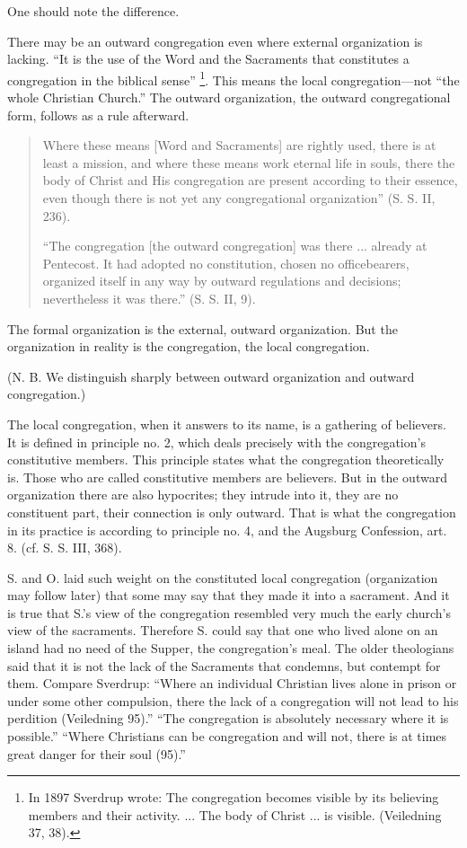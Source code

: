 One should note the difference.

There may be an outward congregation even where external organization is lacking. “It is the use of the Word and the Sacraments that constitutes a congregation in the biblical sense” \footnote{In 1897 Sverdrup wrote: The congregation becomes visible by its believing members and their activity. ... The body of Christ ... is visible. (Veiledning 37, 38).}. This means the local congregation—not “the whole Christian Church.” The outward organization, the outward congregational form, follows as a rule afterward.

\begin{quote}
Where these means [Word and Sacraments] are rightly used, there is at least a mission, and where these means work eternal life in souls, there the body of Christ and His congregation are present according to their essence, even though there is not yet any congregational organization” (S. S. II, 236).

“The congregation [the outward congregation] was there ... already at Pentecost. It had adopted no constitution, chosen no officebearers, organized itself in any way by outward regulations and decisions; nevertheless it was there.” (S. S. II, 9).

\end{quote}

The formal organization is the external, outward organization. But the organization in reality is the congregation, the local congregation.

(N. B. We distinguish sharply between outward organization and outward congregation.)

The local congregation, when it answers to its name, is a gathering of believers. It is defined in principle no. 2, which deals precisely with the congregation’s constitutive members. This principle states what the congregation theoretically is. Those who are called constitutive members are believers. But in the outward organization there are also hypocrites; they intrude into it, they are no constituent part, their connection is only outward. That is what the congregation in its practice is according to principle no. 4, and the Augsburg Confession, art. 8. (cf. S. S. III, 368).

S. and O. laid such weight on the constituted local congregation (organization may follow later) that some may say that they made it into a sacrament. And it is true that S.’s view of the congregation resembled very much the early church’s view of the sacraments. Therefore S. could say that one who lived alone on an island had no need of the Supper, the congregation’s meal. The older theologians said that it is not the lack of the Sacraments that condemns, but contempt for them. Compare Sverdrup: “Where an individual Christian lives alone in prison or under some other compulsion, there the lack of a congregation will not lead to his perdition (Veiledning 95).” “The congregation is absolutely necessary where it is possible.” “Where Christians can be congregation and will not, there is at times great danger for their soul (95).”

